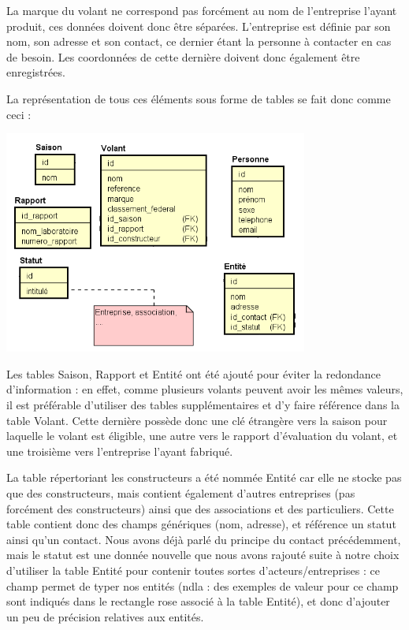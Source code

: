 \documentclass[french,a4paper,12pt]{report}
\begin{document}
La marque du volant ne correspond pas forcément au nom de l'entreprise l'ayant
produit, ces données doivent donc être séparées. L'entreprise est définie par
son nom, son adresse et son contact, ce dernier étant la personne à contacter
en cas de besoin. Les coordonnées de cette dernière doivent donc également être
 enregistrées.

La représentation de tous ces éléments sous forme de tables se fait donc comme
ceci :

\includegraphics[width=10cm]{ensemble1.png}

Les tables Saison, Rapport et Entité ont été ajouté pour éviter la redondance
d'information : en effet, comme plusieurs volants peuvent avoir les mêmes
valeurs, il est préférable d'utiliser des tables supplémentaires et d'y faire
référence dans la table Volant. Cette dernière possède donc une clé étrangère
vers la saison pour laquelle le volant est éligible, une autre vers le rapport
d'évaluation du volant, et une troisième vers l'entreprise l'ayant fabriqué.

La table répertoriant les constructeurs a été nommée Entité car elle ne stocke
pas que des constructeurs, mais contient également d'autres entreprises (pas
forcément des constructeurs) ainsi que des associations et des particuliers.
Cette table contient donc des champs génériques (nom, adresse), et référence un
 statut ainsi qu'un contact. Nous avons déjà parlé du principe du contact
 précédemment, mais le statut est une donnée nouvelle que nous avons rajouté
 suite à notre choix d'utiliser la table Entité pour contenir toutes sortes
 d'acteurs/entreprises : ce champ permet de typer nos entités (ndla : des
 exemples de valeur pour ce champ sont indiqués dans le rectangle rose associé
 à la table Entité), et donc d'ajouter un peu de précision relatives aux entités.
\end{document}
